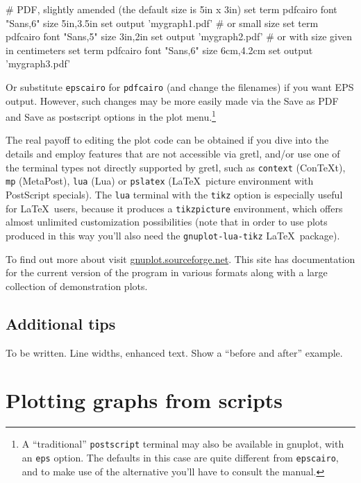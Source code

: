 \begin{code}
# PDF, slightly amended (the default size is 5in x 3in)
set term pdfcairo font "Sans,6" size 5in,3.5in
set output 'mygraph1.pdf'
# or small size
set term pdfcairo font "Sans,5" size 3in,2in
set output 'mygraph2.pdf'
# or with size given in centimeters
set term pdfcairo font "Sans,6" size 6cm,4.2cm
set output 'mygraph3.pdf'
\end{code}

Or substitute \texttt{epscairo} for \texttt{pdfcairo} (and change the
filenames) if you want EPS output. However, such changes may be more
easily made via the \textsf{Save as PDF} and \textsf{Save as
  postscript} options in the plot menu.\footnote{A ``traditional''
  \texttt{postscript} terminal may also be available in gnuplot, with
  an \texttt{eps} option. The defaults in this case are quite
  different from \texttt{epscairo}, and to make use of the alternative
  you'll have to consult the  manual.}

The real payoff to editing the plot code can be obtained if you dive
into the details and employ  features that are not
accessible via gretl, and/or use one of the terminal types not
directly supported by gretl, such as \texttt{context} (ConTeXt),
\texttt{mp} (MetaPost), \texttt{lua} (Lua) or \texttt{pslatex}
(\LaTeX\ picture environment with PostScript specials). The
\texttt{lua} terminal with the \texttt{tikz} option is especially
useful for \LaTeX\ users, because it produces a \texttt{tikzpicture}
environment, which offers almost unlimited customization possibilities
(note that in order to use plots produced in this way you'll also need
the \texttt{gnuplot-lua-tikz} \LaTeX\ package).

To find out more about  visit
\href{https://gnuplot.sourceforge.net/}{gnuplot.sourceforge.net}. This
site has documentation for the current version of the program in
various formats along with a large collection of demonstration plots.

\subsection{Additional tips}
\label{subsect-graph-tips}

To be written.  Line widths, enhanced text.  Show a ``before and
after'' example.  

\section{Plotting graphs from scripts}
\label{sec:plotenv}

